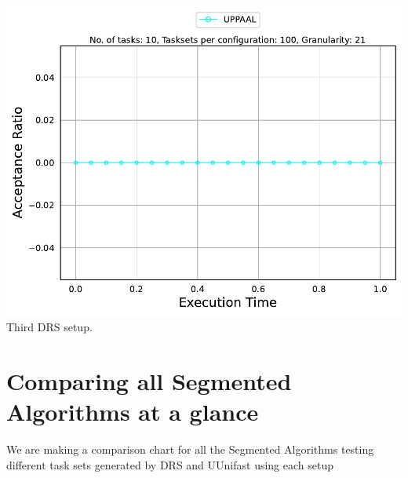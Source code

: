 \documentclass[]{article}
\begin{document}
\begin{minipage}[t]{0.48\linewidth}
            \includegraphics[width=\linewidth]{UPPAAL_3rd.pdf}
		Third DRS setup.
		\vspace{0.3cm}       

	\end{minipage}


	\clearpage
	\section{Comparing all Segmented Algorithms at a glance}
{
\raggedleft We are making a comparison chart for all the Segmented Algorithms testing different task sets generated by DRS and UUnifast using each setup \newline
}
\end{document}
